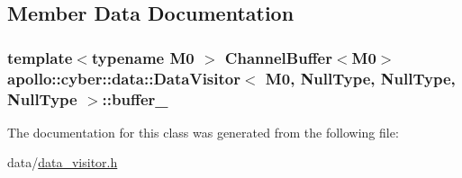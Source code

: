 \subsection{Member Data Documentation}
\hypertarget{classapollo_1_1cyber_1_1data_1_1DataVisitor_3_01M0_00_01NullType_00_01NullType_00_01NullType_01_4_a71f818743c76bcbfbb3bbe687ce1f2ce}{
\subsubsection[{buffer\-\_\-}]{\setlength{\rightskip}{0pt plus 5cm}template$<$typename M0 $>$ {\bf Channel\-Buffer}$<$M0$>$ {\bf apollo\-::cyber\-::data\-::\-Data\-Visitor}$<$ M0, {\bf Null\-Type}, {\bf Null\-Type}, {\bf Null\-Type} $>$\-::buffer\-\_\-\hspace{0.3cm}{\ttfamily [private]}}}\label{classapollo_1_1cyber_1_1data_1_1DataVisitor_3_01M0_00_01NullType_00_01NullType_00_01NullType_01_4_a71f818743c76bcbfbb3bbe687ce1f2ce}


The documentation for this class was generated from the following file\-:\begin{DoxyCompactItemize}
\item 
data/\hyperlink{data__visitor_8h}{data\-\_\-visitor.\-h}\end{DoxyCompactItemize}
